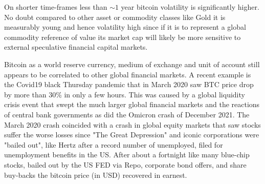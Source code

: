 \documentclass[final,5p,times,twocolumn,authoryear]{elsarticle}
\begin{document}
On shorter time-frames less than $\sim 1$ year bitcoin volatility is significantly higher. No doubt compared to other asset or commodity classes like Gold it is measurably young and hence volatility high since if it is to represent a global commodity reference of value its market cap will likely be more sensitive to external speculative financial capital markets. 

Bitcoin as a world reserve currency, medium of exchange and unit of account still appears to be correlated to other global financial markets. A recent example is the Covid19 black Thursday pandemic that in March 2020 saw BTC price drop by more than 30\% in only a few hours. This was caused by a global liquidity crisis event that swept the much larger global financial markets and the reactions of central bank governments as did the Omicron crash of December 2021. The March 2020 crash coincided with a crash in global equity markets that saw stocks suffer the worse losses since "The Great Depression" and iconic corporations were "bailed out", like Hertz after a record number of unemployed, filed for unemployment benefits in the US. After about a fortnight like many blue-chip stocks, bailed out by the US FED via Repo, corporate bond offers, and share buy-backs the bitcoin price (in USD) recovered in earnest.
 
\end{document}
